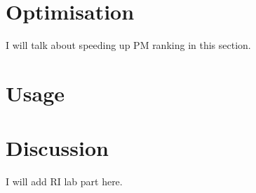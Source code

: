 \section{Optimisation}

I will talk about speeding up PM ranking in this section.

\section{Usage}

\section{Discussion}

I will add RI lab part here.

%
%
%
